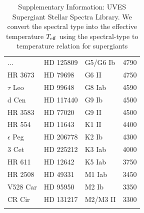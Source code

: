 \begin{table}
\begin{center}
\begin{tabular}{lllc}
$\dots$        & HD 125809   & G5/G6      Ib &         4790\\
HR 3673        &  HD 79698   &    G6      II &         4750\\
$\tau$ Leo     &  HD 99648   &    G8     Iab &         4590\\
d Cen          & HD 117440   &    G9      Ib &         4500\\
HR 3583        &  HD 77020   &    G9      II &         4500\\
HR 554         &  HD 11643   &    K1      II &         4400\\
$\epsilon$ Peg & HD 206778   &    K2      Ib &         4300\\
3 Cet          & HD 225212   &    K3     Iab &         4000\\
HR 611         &  HD 12642   &    K5     Iab &         3750\\
HR 2508        & HD 49331    &    M1      Iab &        3450\\
V528 Car       & HD 95950    &    M2      Ib &         3350\\
CR Cir         & HD 131217   & M2/M3      II &         3300\\

\hline\label{tab:UVESstellarlib}
\end{tabular}
\caption{Supplementary Information: UVES Supergiant Stellar Spectra Library\cite{Bagnulo03}. We
convert the spectral type into the effective temperature $T_{\rm eff}$ 
using the
spectral-type to temperature relation for
supergiants \cite{Humphreys84}}
\end{center}
\end{table}


